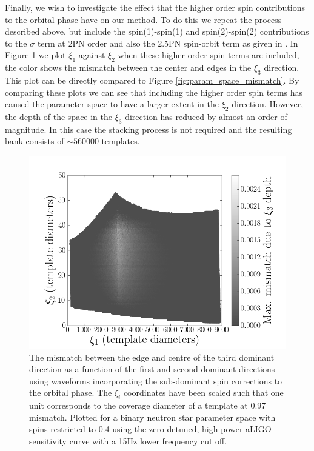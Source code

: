 Finally, we wish to investigate the effect that the higher order spin contributions to the orbital phase
have on our method. To do this we repeat the process described above, but include the spin(1)-spin(1) and
spin(2)-spin(2) contributions to the $\sigma$ term at 2PN order and also the 2.5PN spin-orbit term as given
in \cite{Arun:2008kb}. In Figure \ref{fig:higher_order_spin} we plot $\xi_1$ against $\xi_2$ when these
higher order spin terms are included, the color shows the mismatch between the center and edges
in the $\xi_3$ direction. This plot can be directly compared to Figure \ref{fig:param_space_mismatch}.
By comparing these plots we can see that including the higher order spin terms has caused the parameter space
to have a larger extent in the $\xi_2$ direction. However, the depth of the space in the $\xi_3$ direction
has reduced by almost an order of magnitude. In this case the stacking process is not required and the resulting
bank consists of $\sim560000$ templates. 

\begin{figure}
\begin{center}
\includegraphics[width=1.0\textwidth]{papers/bns_spin/figure8.png}
\end{center}
\caption{\label{fig:higher_order_spin} The mismatch between the edge and centre of the
third dominant direction as a function of the first and second dominant
directions using waveforms incorporating the sub-dominant spin corrections to the orbital phase.
The $\xi_i$ coordinates have been scaled
such that one unit corresponds to the coverage diameter of a template
at 0.97 mismatch.
Plotted for a binary neutron star parameter space with spins restricted
to 0.4
using the zero-detuned, high-power aLIGO sensitivity curve with a 15Hz lower frequency cut off.}
\end{figure}

